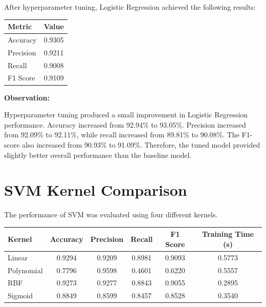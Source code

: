 \documentclass[12pt,a4paper]{article}
\begin{document}
After hyperparameter tuning, Logistic Regression achieved the
following results:

\begin{longtable}{|p{7cm}|c|}
\hline
\textbf{Metric} & \textbf{Value} \\ \hline

Accuracy & 0.9305 \\ \hline

Precision & 0.9211 \\ \hline

Recall & 0.9008 \\ \hline

F1 Score & 0.9109 \\ \hline

\end{longtable}

\textbf{Observation:}

Hyperparameter tuning produced a small improvement in Logistic
Regression performance. Accuracy increased from 92.94\% to 93.05\%.
Precision increased from 92.09\% to 92.11\%, while recall increased
from 89.81\% to 90.08\%. The F1-score also increased from 90.93\%
to 91.09\%. Therefore, the tuned model provided slightly better
overall performance than the baseline model.


\section{SVM Kernel Comparison}

The performance of SVM was evaluated using four different kernels.

\begin{longtable}{|p{3cm}|c|c|c|c|c|}
\hline
\textbf{Kernel} &
\textbf{Accuracy} &
\textbf{Precision} &
\textbf{Recall} &
\textbf{F1 Score} &
\textbf{Training Time (s)}
\\ \hline

Linear &
0.9294 &
0.9209 &
0.8981 &
0.9093 &
0.5773
\\ \hline

Polynomial &
0.7796 &
0.9598 &
0.4601 &
0.6220 &
0.5557
\\ \hline

RBF &
0.9273 &
0.9277 &
0.8843 &
0.9055 &
0.2895
\\ \hline

Sigmoid &
0.8849 &
0.8599 &
0.8457 &
0.8528 &
0.3540
\\ \hline

\end{longtable}
\end{document}
